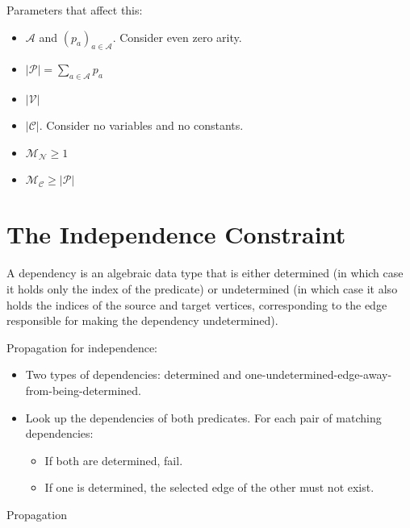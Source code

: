 \documentclass[runningheads]{llncs}
\newcommand{\predicates}{\mathcal{P}}
\newcommand{\variables}{\mathcal{V}}
\newcommand{\constants}{\mathcal{C}}
\newcommand{\arities}{\mathcal{A}}
\newcommand{\maxNumNodes}{\mathcal{M}_{\mathcal{N}}}
\newcommand{\maxNumClauses}{\mathcal{M}_{\mathcal{C}}}
\begin{document}
Parameters that affect this:
\begin{itemize}
\item $\arities{}$ and $(p_a)_{a \in \arities{}}$. Consider even zero arity.
\item $|\predicates{}| = \sum_{a \in \arities{}} p_a$
\item $|\variables{}|$
\item $|\constants{}|$. Consider no variables and no constants.
\item $\maxNumNodes{} \ge 1$
\item $\maxNumClauses{} \ge |\predicates{}|$
\end{itemize}

\section{The Independence Constraint}

A dependency is an algebraic data type that is either determined (in which case
it holds only the index of the predicate) or undetermined (in which case it also
holds the indices of the source and target vertices, corresponding to the edge
responsible for making the dependency undetermined).

Propagation for independence:
\begin{itemize}
\item Two types of dependencies: determined and
  one-undetermined-edge-away-from-being-determined.
\item Look up the dependencies of both predicates. For each pair of
  matching dependencies:
  \begin{itemize}
  \item If both are determined, fail.
  \item If one is determined, the selected edge of the other must not
    exist.
  \end{itemize}
\end{itemize}

\begin{algorithm}
  \caption{Propagation}
\end{algorithm}
\end{document}
